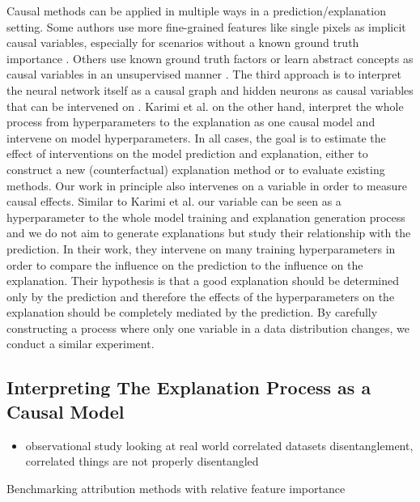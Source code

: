 Causal methods can be applied in multiple ways in a prediction/explanation setting.
Some authors use more fine-grained features like single pixels as implicit causal variables, especially for scenarios without a known ground truth importance \cite{Zeiler2013,Fong2017,Samek2017a}. Others use known ground truth factors or learn abstract concepts as causal variables in an unsupervised manner \cite{Goyal2019, Tran2022, Reimers2019, Reimers2020, Harradon2018}. The third approach is to interpret the neural network itself as a causal graph and hidden neurons as causal variables that can be intervened on \cite{Narendra2018, Chattopadhyay2019}. Karimi et al. \cite{Karimi2023} on the other hand, interpret the whole process from hyperparameters to the explanation as one causal model and intervene on model hyperparameters. 
In all cases, the goal is to estimate the effect of interventions on the model prediction and explanation, either to construct a new (counterfactual) explanation method or to evaluate existing methods.
Our work in principle also intervenes on a variable in order to measure causal effects. Similar to Karimi et al. \cite{Karimi2023} our variable can be seen as a hyperparameter to the whole model training and explanation generation process and we do not aim to generate explanations but study their relationship with the prediction. In their work, they intervene on many training hyperparameters in order to compare the influence on the prediction to the influence on the explanation. Their hypothesis is that a good explanation should be determined only by the prediction and therefore the effects of the hyperparameters on the explanation should be completely mediated by the prediction. By carefully constructing a process where only one variable in a data distribution changes, we conduct a similar experiment. 


\subsection{Interpreting The Explanation Process as a Causal Model}

\begin{itemize}
    \item observational study looking at real world correlated datasets disentanglement, correlated things are not properly disentangled \cite{Traeuble2021} 
\end{itemize}

 \cite{Yang2019} Benchmarking attribution methods with relative feature importance


